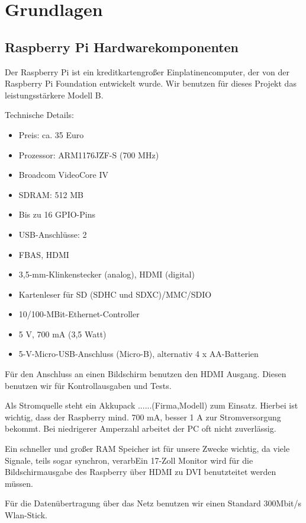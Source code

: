 \documentclass[12pt]{article}
\begin{document}
\section{Grundlagen}

\subsection{Raspberry Pi Hardwarekomponenten}

Der Raspberry Pi ist ein kreditkartengroßer Einplatinencomputer, der von der Raspberry Pi Foundation entwickelt wurde.
Wir benutzen für dieses Projekt das leistungsstärkere Modell B.

Technische Details:

\begin{itemize}
\item Preis: ca. 35 Euro
\item Prozessor: ARM1176JZF-S (700 MHz)
\item Broadcom VideoCore IV
\item SDRAM: 512 MB
\item Bis zu 16 GPIO-Pins
\item USB-Anschlüsse: 2
\item FBAS, HDMI
\item 3,5-mm-Klinkenstecker (analog), HDMI (digital)
\item Kartenleser für SD (SDHC und SDXC)/MMC/SDIO
\item 10/100-MBit-Ethernet-Controller 
\item 5 V, 700 mA (3,5 Watt)
\item 5-V-Micro-USB-Anschluss (Micro-B), alternativ 4 x AA-Batterien
\end{itemize}

Für den Anschluss an einen Bildschirm benutzen den HDMI Ausgang.
Diesen benutzen wir für Kontrollausgaben und Tests.

Als Stromquelle steht ein Akkupack ......(Firma,Modell) zum Einsatz. 
Hierbei ist wichtig, dass der Raspberry mind. 700 mA, besser 1 A zur Stromversorgung bekommt. 
Bei niedrigerer Amperzahl arbeitet der PC oft nicht zuverlässig.

Ein schneller und großer RAM Speicher ist für unsere Zwecke wichtig, da viele Signale, teils sogar synchron, verarbEin 17-Zoll Monitor wird für die Bildschirmausgabe des Raspberry über HDMI zu DVI benutzteitet werden müssen.

Für die Datenübertragung über das Netz benutzen wir einen Standard 300Mbit/s Wlan-Stick.
\end{document}

